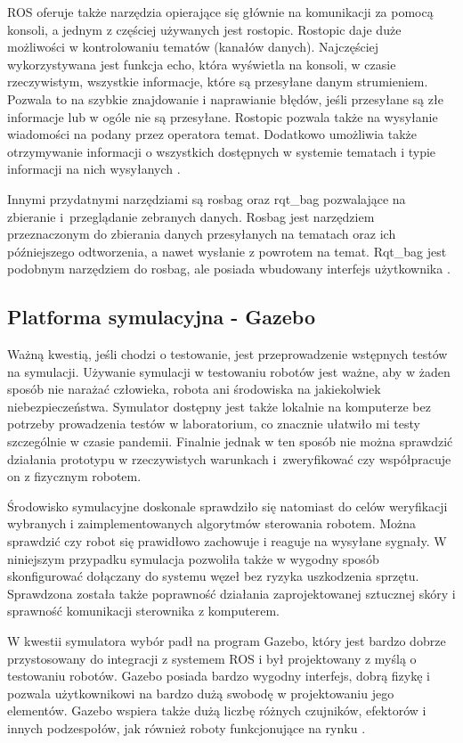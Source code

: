 
ROS oferuje także narzędzia opierające się głównie na komunikacji za pomocą konsoli, a jednym z częściej używanych jest rostopic. Rostopic daje duże możliwości w kontrolowaniu tematów (kanałów danych). Najczęściej wykorzystywana jest funkcja echo, która wyświetla na konsoli, w czasie rzeczywistym, wszystkie informacje, które są przesyłane danym strumieniem. Pozwala to na szybkie znajdowanie i naprawianie błędów, jeśli przesyłane są złe informacje lub w ogóle nie są przesyłane. Rostopic pozwala także na wysyłanie wiadomości na podany przez operatora temat. Dodatkowo umożliwia także otrzymywanie informacji o wszystkich dostępnych w systemie tematach i typie informacji na nich wysyłanych \cite{b_site_ROS_tools}.

Innymi przydatnymi narzędziami są rosbag oraz rqt\_bag pozwalające na zbieranie i~przeglądanie zebranych danych. Rosbag jest narzędziem przeznaczonym do zbierania danych przesyłanych na tematach oraz ich późniejszego odtworzenia, a nawet wysłanie z powrotem na temat. Rqt\_bag jest podobnym narzędziem do rosbag, ale posiada wbudowany interfejs użytkownika \cite{b_site_ROS_tools}.


\subsection{Platforma symulacyjna - Gazebo}
\label{ss_narzedzia_gazebo}
Ważną kwestią, jeśli chodzi o testowanie, jest przeprowadzenie wstępnych testów na symulacji. Używanie symulacji w testowaniu robotów jest ważne, aby w żaden sposób nie narażać człowieka, robota ani środowiska na jakiekolwiek niebezpieczeństwa. 
Symulator dostępny jest także lokalnie na komputerze bez potrzeby prowadzenia testów w laboratorium, co znacznie ułatwiło mi testy szczególnie w czasie pandemii. 
Finalnie jednak w ten sposób nie można sprawdzić działania prototypu w rzeczywistych warunkach i~zweryfikować czy współpracuje on z fizycznym robotem.

Środowisko symulacyjne doskonale sprawdziło się natomiast do celów weryfikacji wybranych i zaimplementowanych algorytmów sterowania robotem. Można sprawdzić czy robot się prawidłowo zachowuje i reaguje na wysyłane sygnały.
W niniejszym przypadku symulacja pozwoliła także w wygodny sposób skonfigurować dołączany do systemu węzeł bez ryzyka uszkodzenia sprzętu. Sprawdzona została także poprawność działania zaprojektowanej sztucznej skóry i sprawność komunikacji sterownika z komputerem.

W kwestii symulatora wybór padł na program Gazebo, który jest bardzo dobrze przystosowany do integracji z systemem ROS i był projektowany z myślą o testowaniu robotów. Gazebo posiada bardzo wygodny interfejs, dobrą fizykę i pozwala użytkownikowi na bardzo dużą swobodę w projektowaniu jego elementów. Gazebo wspiera także dużą liczbę różnych czujników, efektorów i innych podzespołów, jak również roboty funkcjonujące na rynku \cite{b_site_Gazebo}.


